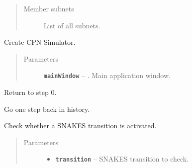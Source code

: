 \documentclass[a4paper,10pt,english]{sphinxmanual}
\begin{document}
\begin{fulllineitems}
\begin{quote}
\begin{description}
\item[{Member subnets}] \leavevmode
List of all subnets.

\end{description}\end{quote}

\begin{fulllineitems}
\label{model_link:model.CPNSimulator.CPNSimulator.__init__}
Create CPN Simulator.
\begin{quote}\begin{description}
\item[{Parameters}] \leavevmode
\textbf{\texttt{mainWindow}} -- . Main application window.

\end{description}\end{quote}

\end{fulllineitems}


\begin{fulllineitems}
\label{model_link:model.CPNSimulator.CPNSimulator.back2beginning}
Return to step 0.

\end{fulllineitems}


\begin{fulllineitems}
\label{model_link:model.CPNSimulator.CPNSimulator.backStep}
Go one step back in history.

\end{fulllineitems}


\begin{fulllineitems}
\label{model_link:model.CPNSimulator.CPNSimulator.checkTranistionActivation}
Check whether a SNAKES transition is activated.
\begin{quote}\begin{description}
\item[{Parameters}] \leavevmode\begin{itemize}
\item {} 
\textbf{\texttt{transition}} -- SNAKES transition to check.


\end{itemize}
\end{description}
\end{quote}
\end{fulllineitems}
\end{fulllineitems}
\end{document}
